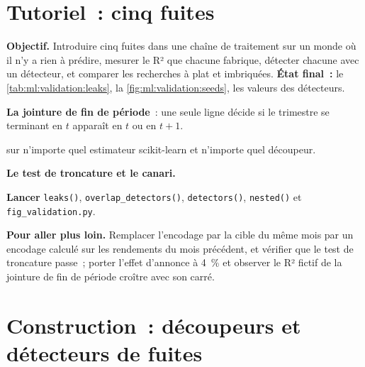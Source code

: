 \section{Tutoriel~: cinq fuites}\label{tut:ml:validation:tut}

\begin{tutorial}
\textbf{Objectif.} Introduire cinq fuites dans une chaîne de traitement sur un monde où il n'y a rien à prédire, mesurer le R² que chacune fabrique,
détecter chacune avec un détecteur, et comparer les recherches à plat et imbriquées. \textbf{État final~:} le \cref{tab:ml:validation:leaks},
la \cref{fig:ml:validation:seeds}, les valeurs des détecteurs.
\begin{tutsteps}
\item \textbf{La jointure de fin de période}~: une seule ligne décide si le trimestre se terminant en $t$ apparaît en $t$ ou en $t+1$.
\label{lst:ml:validation:join}
\item \textbf{} sur n'importe quel estimateur scikit-learn et n'importe quel découpeur.
\label{lst:ml:validation:nested}
\item \textbf{Le test de troncature et le canari.}
\label{lst:ml:validation:detectors}
\item \textbf{Lancer} \texttt{leaks()}, \texttt{overlap\_detectors()}, \texttt{detectors()}, \texttt{nested()} et
\texttt{fig\_validation.py}.
\end{tutsteps}
\textbf{Pour aller plus loin.} Remplacer l'encodage par la cible du même mois par un encodage calculé sur les rendements du mois précédent, et
vérifier que le test de troncature passe~; porter l'effet d'annonce à 4~\% et observer le R² fictif de la jointure de fin de période
croître avec son carré.
\end{tutorial}

\section{Construction~: découpeurs et détecteurs de fuites}\label{bld:ml:validation:cvsplit}


